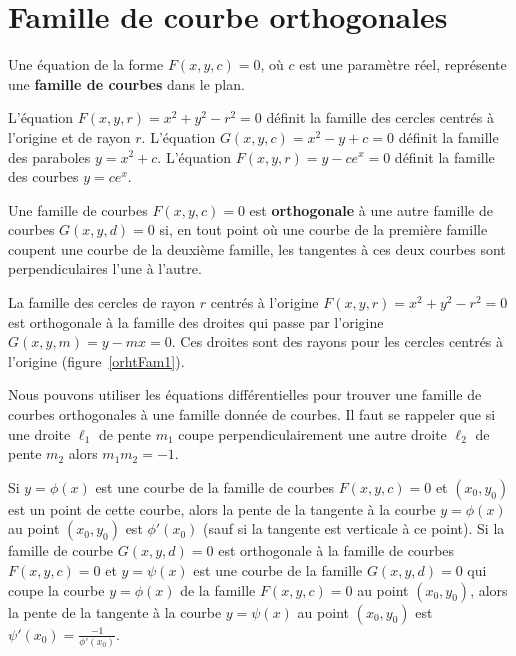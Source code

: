 {\section{Famille de courbe orthogonales \eng}

\begin{focus}{\dfn} 
Une équation de la forme $F(x,y,c)=0$, où $c$ est une paramètre réel,
représente une {\bfseries famille de courbes} dans le plan.
\end{focus}

\begin{egg}
L'équation $F(x,y,r) = x^2+y^2-r^2 = 0$ définit la famille des cercles
centrés à l'origine et de rayon $r$.  L'équation
$G(x,y,c) = x^2 -y + c = 0$ définit la famille des paraboles
$y=x^2 +c$.  L'équation 
$F(x,y,r) = y - c e^x = 0$ définit la famille des courbes $y=ce^x$.
\end{egg}

\begin{focus}{\dfn} 
Une famille de courbes $F(x,y,c)=0$ est {\bfseries orthogonale} à une
autre famille de courbes $G(x,y,d)=0$ si, en tout point où une courbe
de la première famille coupent une courbe de la deuxième famille, les
tangentes à ces deux courbes sont perpendiculaires l'une à l'autre.
\end{focus}

\begin{egg}
La famille des cercles de rayon $r$ centrés à l'origine
$F(x,y,r) = x^2+y^2-r^2=0$ est orthogonale à la famille des droites
qui passe par l'origine $G(x,y,m) = y - mx =0$.  Ces droites sont des
rayons pour les cercles centrés à l'origine (figure~\ref{orhtFam1}).
\end{egg}


Nous pouvons utiliser les équations différentielles pour trouver une
famille de courbes orthogonales à une famille donnée de courbes.  Il
faut se rappeler que si une droite $\ell_1$ de pente $m_1$ coupe
perpendiculairement une autre droite $\ell_2$ de pente $m_2$ alors
$m_1 m_2 = -1$.

Si $y=\phi(x)$ est une courbe de la famille de courbes $F(x,y,c)=0$ et
$(x_0,y_0)$ est un point de cette courbe, alors la pente de la
tangente à la courbe $y=\phi(x)$ au point $(x_0,y_0)$ est $\phi'(x_0)$
(sauf si la tangente est verticale à ce point).  Si la famille de courbe
$G(x,y,d)=0$ est orthogonale à la famille de courbes $F(x,y,c)=0$ et
$y=\psi(x)$ est une courbe de la famille $G(x,y,d)=0$ qui coupe la courbe
$y=\phi(x)$ de la famille $F(x,y,c)=0$ au point $(x_0,y_0)$, alors la
pente de la tangente à la courbe $y=\psi(x)$ au point $(x_0,y_0)$ est
$\displaystyle \psi'(x_0) = \frac{-1}{\phi'(x_0)}$.

}
